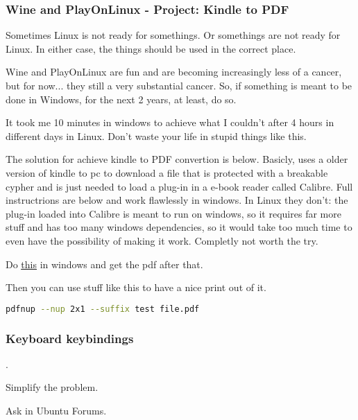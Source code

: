 \subsubsection{Wine and PlayOnLinux - Project: Kindle to PDF}
\par Sometimes Linux is not ready for somethings. Or somethings are not ready for Linux. In either case, the things should be used in the correct place.

\par {} Wine and PlayOnLinux are fun and are becoming increasingly less of a cancer, but for now... they still a very substantial cancer. So, if something is meant to be done in Windows, for the next 2 years, at least, do so. 

\par It took me 10 minutes in windows to achieve what I couldn't after 4 hours in different days in Linux. Don't waste your life in stupid things like this.

\par The solution for achieve kindle to PDF convertion is below. Basicly, uses a older version of kindle to pc to download a file that is protected with a breakable cypher and is just needed to load a plug-in in a e-book reader called Calibre. Full instructrions are below and work flawlessly in windows. In Linux they don't: the plug-in loaded into Calibre is meant to run on windows, so it requires far more stuff and has too many windows dependencies, so it would take too much time to even have the possibility of making it work. Completly not worth the try.

\par Do \href{https://askubuntu.com/questions/1011989/where-are-amazon-kindle-ebooks-on-my-linux-pc-after-i-download-them-for-offline/1012193#1012193}{\ul{this}} in windows and get the pdf after that.

\par Then you can use stuff like this to have a nice print out of it.
\begin{lstlisting}[language=bash]
    pdfnup --nup 2x1 --suffix test file.pdf
\end{lstlisting}


\subsubsection{Keyboard keybindings} \label{sec:linux_life_lessons_keybindings}

{\large {}. \par Simplify the problem. \par Ask in Ubuntu Forums.}

